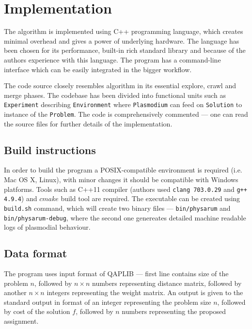\section{Implementation}
\label{section:project_implementation}

The algorithm is implemented using C++ programming language, which creates minimal overhead and gives a power of underlying hardware. The language has been chosen for its performance, built-in rich standard library and because of the authors experience with this language. The program has a command-line interface which can be easily integrated in the bigger workflow.

The code source closely resembles algorithm in its essential explore, crawl and merge phases. The codebase has been divided into functional units such as \texttt{Experiment} describing \texttt{Environment} where \texttt{Plasmodium} can feed on \texttt{Solution} to instance of the \texttt{Problem}. The code is comprehensively commented --- one can read the source files for further details of the implementation.

\subsection{Build instructions}

In order to build the program a POSIX-compatible environment is required (i.e. Mac OS X, Linux), with minor changes it should be compatible with Windows platforms. Tools such as C++11 compiler (authors used \texttt{clang 703.0.29} and \texttt{g++ 4.9.4}) and $cmake$ build tool are required. The executable can be created using \texttt{build.sh} command, which will create two binary files --- \texttt{bin/physarum} and \texttt{bin/physarum-debug}, where the second one genereates detailed machine readable logs of plasmodial behaviour.

\subsection{Data format}

The program uses input format of QAPLIB \cite{burkard1997qaplib} --- first line contains size of the problem $n$, followed by $n{\times}n$ numbers representing distance matrix, followed by another $n{\times}n$ integers representing the weight matrix. An output is given to the standard output in format of an integer representing the problem size $n$, followed by cost of the solution $f$, followed by $n$ numbers representing the proposed assignment.

